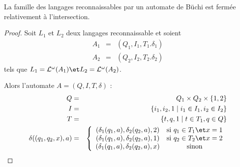 \begin{prop}
	La famille des langages reconnaissables par un automate de Büchi est fermée relativement à l'intersection.
\end{prop}

\begin{proof}
	Soit $L_1$ et $L_2$ deux langages reconnaissable et soient
	\begin{eqnarray*}
		A_1 &=& (Q_1,I_1,T_1.\delta_1) \\
		A_2 &=& (Q_2,I_2,T_2.\delta_2)
	\end{eqnarray*}
	tels que $L_1 = \La ^ {\omega} (A_1) \et  L_2 = \La ^ {\omega} (A_2)$.

	Alors l'automate $A = (Q,I,T,\delta)$ :
	\begin{eqnarray*}
		Q &=& Q_1 \times Q_2 \times \set{1,2}  \\
		I &=& \setdef {i_1,i_2,1} {i_1 \in I_1,i_2 \in I_2 } \\
		T &=&  \setdef {t,q,1} {t \in T_1, q \in Q} \\
		\delta ((q_1,q_2,x), a) &=&
		\left\{
		\begin{array}{cc}
			(\delta_1(q_1,a), \delta_2 (q_2,a), 2) & \text {si } q_1 \in T_1 \et x = 1 \\
			(\delta_1(q_1,a), \delta_2 (q_2,a), 1) & \text {si } q_2 \in T_2 \et x = 2 \\
			(\delta_1(q_1,a), \delta_2 (q_2,a), x) & \text {sinon}
		\end{array}
		\right.
	\end{eqnarray*}
\end{proof}

